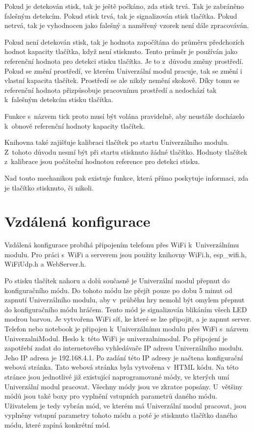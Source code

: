 Pokud je detekován stisk, tak je ještě počkáno, zda stisk trvá. Tak je zabráněno falešným detekcím. Pokud stisk trvá, tak je signalizován stisk tlačítka. Pokud netrvá, tak je vyhodnocen jako falešný a naměřený vzorek 
není dále zpracováván.

Pokud není detekován stisk, tak je hodnota započítána do průměru předchozích hodnot kapacity tlačítka, když není stisknuto. Tento průměr je používán jako referenční hodnota pro detekci stisku tlačítka. Je to z~důvodu 
změny prostředí. Pokud se změní prostředí, ve kterém Univerzální modul pracuje, tak se změní i vlastní kapacita tlačítek. Prostředí se ale nikdy nemění skokově. Díky tomu se referenční hodnota přizpůsobuje pracovnímu 
prostředí a nedochází tak k~falešným detekcím stisku tlačítka. 

Funkce s~názvem tick proto musí být volána pravidelně, aby neustále docházelo k~obnově referenční hodnoty kapacity tlačítek. 

Knihovna také zajišťuje kalibraci tlačítek po startu Univerzálního modulu. Z~tohoto důvodu nesmí být při startu stisknuto žádné tlačítko. Hodnoty tlačítek z~kalibrace jsou počáteční hodnotou reference pro detekci stisku. 

Nad touto mechanikou pak existuje funkce, která přímo poskytuje informaci, zda je tlačítko stisknuto, či nikoli. 

\section{Vzdálená konfigurace}
Vzdálená konfigurace probíhá připojením telefonu přes WiFi k~Univerzálnímu modulu. Pro práci s~WiFi a serverem jsou použity knihovny WiFi.h, esp\_wifi.h, WiFiUdp.h a WebServer.h. 

Po stisku tlačítek nahoru a dolů současně je Univerzální modul přepnut do konfiguračního módu. Do tohoto módu lze přejít pouze po dobu 5 minut od zapnutí Univerzálního modulu, aby v~průběhu hry nemohl 
být omylem přepnut do konfiguračního módu hráčem. Tento mód je signalizován blikáním všech LED modrou barvou. Je vytvořena WiFi síť, ke které se lze připojit, a je zapnut server. Telefon nebo notebook je připojen 
k~Univerzálnímu modulu přes WiFi s~názvem UniverzalniModul. Heslo k~této WiFi je univerzalnimodul. Po připojení je zapotřebí zadat do internetového vyhledávače IP adresu Univerzálního modulu. Jeho IP adresa 
je 192.168.4.1. Po zadání této IP adresy je načtena konfigurační webová stránka. Tato webová stránka byla vytvořena v~HTML kódu. Na této stránce jsou jednotlivé již existující naprogramované módy, ve kterých umí 
Univerzální modul pracovat. Všechny módy jsou ve zkratce popsány. U~většiny módů jsou také boxy pro vyplnění vstupních parametrů daného módu. Uživatelem je tedy vybrán mód, ve kterém má Univerzální modul pracovat, 
jsou vyplněny vstupní parametry tohoto módu a poté je stisknuto tlačítko daného módu, které zapíná konkrétní mód. 

